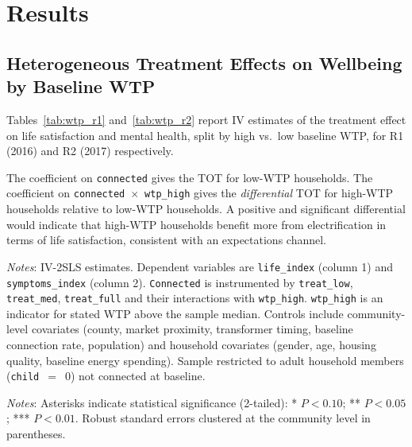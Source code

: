 \documentclass[letter,12pt]{article}
\newcommand{\starnote}{
  \noindent\emph{Notes}: Asterisks indicate statistical significance (2-tailed):
  * $P < 0.10$; ** $P < 0.05$; *** $P < 0.01$.
  Robust standard errors clustered at the community level in parentheses.
}
\begin{document}
\section{Results}

\subsection{Heterogeneous Treatment Effects on Wellbeing by Baseline WTP}

Tables~\ref{tab:wtp_r1} and~\ref{tab:wtp_r2} report IV estimates of the
treatment effect on life satisfaction and mental health, split by high vs.\
low baseline WTP, for R1 (2016) and R2 (2017) respectively.

The coefficient on \texttt{connected} gives the TOT for low-WTP households.
The coefficient on \texttt{connected}~$\times$~\texttt{wtp\_high} gives the
\emph{differential} TOT for high-WTP households relative to low-WTP
households. A positive and significant differential would indicate that
high-WTP households benefit more from electrification in terms of life
satisfaction, consistent with an expectations channel.

\clearpage
{}

\begin{table}[H]
  \centering
  \caption{\textbf{Heterogeneous TOT on Wellbeing by Baseline WTP --- R1 (2016)}}
  \label{tab:wtp_r1}
  \vspace{0.5em}
  
  \vspace{0.5em}
  \begin{minipage}{\linewidth}
    \small
    \emph{Notes}: IV-2SLS estimates. Dependent variables are
    \texttt{life\_index} (column 1) and \texttt{symptoms\_index} (column 2).
    \texttt{Connected} is instrumented by \texttt{treat\_low},
    \texttt{treat\_med}, \texttt{treat\_full} and their interactions with
    \texttt{wtp\_high}. \texttt{wtp\_high} is an indicator for stated WTP
    above the sample median. Controls include community-level covariates
    (county, market proximity, transformer timing, baseline connection rate,
    population) and household covariates (gender, age, housing quality,
    baseline energy spending). Sample restricted to adult household members
    (\texttt{child}~$=$~0) not connected at baseline.
    \starnote
  \end{minipage}
\end{table}
\end{document}
